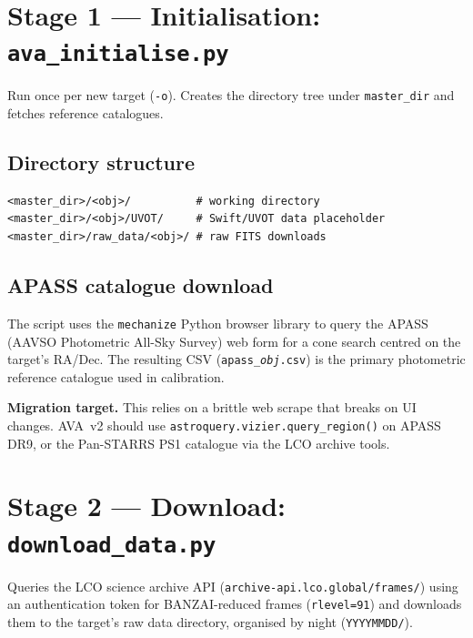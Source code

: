 \documentclass[12pt,a4paper]{article}
\begin{document}
\section{Stage 1 --- Initialisation: \texttt{ava\_initialise.py}}
\label{sec:init}

Run once per new target (\texttt{-o}).  Creates the directory tree under
\texttt{master\_dir} and fetches reference catalogues.

\subsection{Directory structure}
\begin{lstlisting}[style=shell]
<master_dir>/<obj>/          # working directory
<master_dir>/<obj>/UVOT/     # Swift/UVOT data placeholder
<master_dir>/raw_data/<obj>/ # raw FITS downloads
\end{lstlisting}

\subsection{APASS catalogue download}

The script uses the \texttt{mechanize} Python browser library to query the APASS
(AAVSO Photometric All-Sky Survey) web form for a cone search centred on the target's
RA/Dec.  The resulting CSV (\texttt{apass\_\textit{obj}.csv}) is the primary photometric
reference catalogue used in calibration.

\begin{warnbox}
\textbf{Migration target.}  This relies on a brittle web scrape that breaks on UI
changes.  AVA~v2 should use \texttt{astroquery.vizier.query\_region()} on APASS\,DR9,
or the Pan-STARRS PS1 catalogue via the LCO archive tools.
\end{warnbox}

\section{Stage 2 --- Download: \texttt{download\_data.py}}
\label{sec:download}

Queries the LCO science archive API (\texttt{archive-api.lco.global/frames/}) using an
authentication token for BANZAI-reduced frames (\texttt{rlevel=91}) and downloads them
to the target's raw data directory, organised by night (\texttt{YYYYMMDD/}).
\end{document}
